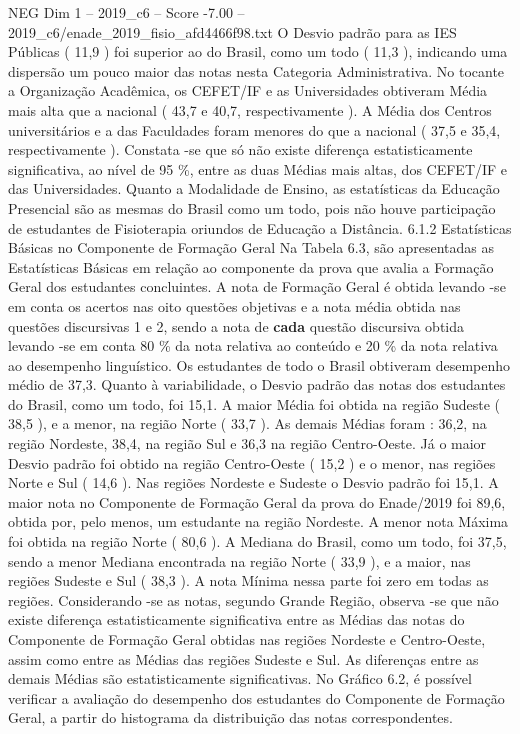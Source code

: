 \begin{textsample}{NEG Dim 1 – 2019\_c6 – Score -7.00 – 2019\_c6/enade\_2019\_fisio\_afd4466f98.txt}
O Desvio padrão para as IES Públicas ( 11,9 ) foi superior ao do Brasil, como um todo ( 11,3 ), indicando uma dispersão um pouco maior das notas nesta Categoria Administrativa.
No tocante a Organização Acadêmica, os CEFET/IF e as Universidades obtiveram Média mais alta que a nacional ( 43,7 e 40,7, respectivamente ).
A Média dos Centros universitários e a das Faculdades foram menores do que a nacional ( 37,5 e 35,4, respectivamente ).
Constata -se que só não existe diferença estatisticamente significativa, ao nível de 95 \%, entre as duas Médias mais altas, dos CEFET/IF e das Universidades.
Quanto a Modalidade de Ensino, as estatísticas da Educação Presencial são as mesmas do Brasil como um todo, pois não houve participação de estudantes de Fisioterapia oriundos de Educação a Distância. 6.1.2 Estatísticas Básicas no Componente de Formação Geral Na Tabela 6.3, são apresentadas as Estatísticas Básicas em relação ao componente da prova que avalia a Formação Geral dos estudantes concluintes.
A nota de Formação Geral é obtida levando -se em conta os acertos nas oito questões objetivas e a nota média obtida nas questões discursivas 1 e 2, sendo a nota de \textbf{cada} questão discursiva obtida levando -se em conta 80 \% da nota relativa ao conteúdo e 20 \% da nota relativa ao desempenho linguístico.
Os estudantes de todo o Brasil obtiveram desempenho médio de 37,3.
Quanto à variabilidade, o Desvio padrão das notas dos estudantes do Brasil, como um todo, foi 15,1.
A maior Média foi obtida na região Sudeste ( 38,5 ), e a menor, na região Norte ( 33,7 ).
As demais Médias foram : 36,2, na região Nordeste, 38,4, na região Sul e 36,3 na região Centro-Oeste.
Já o maior Desvio padrão foi obtido na região Centro-Oeste ( 15,2 ) e o menor, nas regiões Norte e Sul ( 14,6 ).
Nas regiões Nordeste e Sudeste o Desvio padrão foi 15,1.
A maior nota no Componente de Formação Geral da prova do Enade/2019 foi 89,6, obtida por, pelo menos, um estudante na região Nordeste.
A menor nota Máxima foi obtida na região Norte ( 80,6 ).
A Mediana do Brasil, como um todo, foi 37,5, sendo a menor Mediana encontrada na região Norte ( 33,9 ), e a maior, nas regiões Sudeste e Sul ( 38,3 ).
A nota Mínima nessa parte foi zero em todas as regiões.
Considerando -se as notas, segundo Grande Região, observa -se que não existe diferença estatisticamente significativa entre as Médias das notas do Componente de Formação Geral obtidas nas regiões Nordeste e Centro-Oeste, assim como entre as Médias das regiões Sudeste e Sul.
As diferenças entre as demais Médias são estatisticamente significativas.
No Gráfico 6.2, é possível verificar a avaliação do desempenho dos estudantes do Componente de Formação Geral, a partir do histograma da distribuição das notas correspondentes.

\end{textsample}
